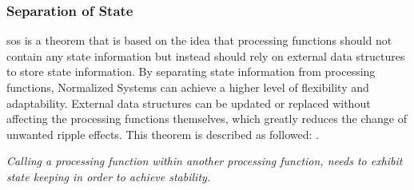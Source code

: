 \subsubsection*{Separation of State}

\gls{sos} is a theorem that is based on the idea that processing functions should not
contain any state information but instead should rely on external data structures to store
state information. By separating state information from processing functions, Normalized
Systems can achieve a higher level of flexibility and adaptability. External data
structures can be updated or replaced without affecting the processing functions
themselves, which greatly reduces the change of unwanted ripple effects. This theorem is
described as followed: \parencite[258]{mannaert_normalized_2016}.

\begin{tcolorbox}[boxrule=0.1pt, colback=mygray, title=Theorem IV,colbacktitle=gray]
        \textit{Calling a processing function within another processing function, needs to exhibit state keeping in order to achieve stability.}
\end{tcolorbox}